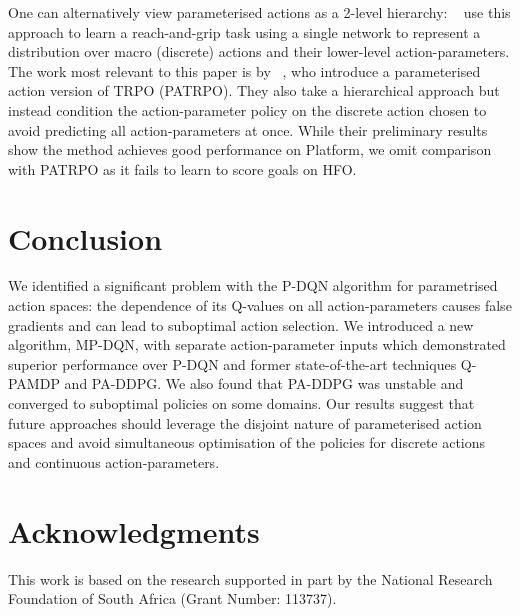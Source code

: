 \documentclass{article}
\def\PDQN*{P\nobreakdash-DQN}
\def\MPDQN*{MP\nobreakdash-DQN}
\def\QPAMDP*{Q\nobreakdash-PAMDP}
\def\PADDPG*{PA\nobreakdash-DDPG}
\newcommand{\citet}[1]
{\citeauthor{#1}~\shortcite{#1}}
\begin{document}
One can alternatively view parameterised actions as a 2-level hierarchy: \citet{klimek2017} use this approach to learn a reach-and-grip task using a single network to represent a distribution over macro (discrete) actions and their lower-level action-parameters. The work most relevant to this paper is by \citet{wei2018}, who introduce a parameterised action version of TRPO (PATRPO). They also take a hierarchical approach but instead condition the action-parameter policy on the discrete action chosen to avoid predicting all action-parameters at once. While their preliminary results show the method achieves good performance on Platform, we omit comparison with PATRPO as it fails to learn to
score goals on HFO.

\section{Conclusion}
We identified a significant problem with the \PDQN* algorithm for parametrised action spaces: the dependence of its Q-values on all action-parameters causes false gradients and can lead to suboptimal action selection. We introduced a new algorithm, \MPDQN*, with separate action-parameter inputs which demonstrated superior performance over \PDQN* and former state-of-the-art techniques \QPAMDP* and \PADDPG*. We also found that \PADDPG* was unstable and converged to suboptimal policies on some domains. Our results suggest that future approaches should leverage the disjoint nature of parameterised action spaces and avoid simultaneous optimisation of the policies for discrete actions and continuous action-parameters.

\section*{Acknowledgments}
This work is based on the research supported in part by the National Research Foundation of South Africa (Grant Number: 113737).



\end{document}
